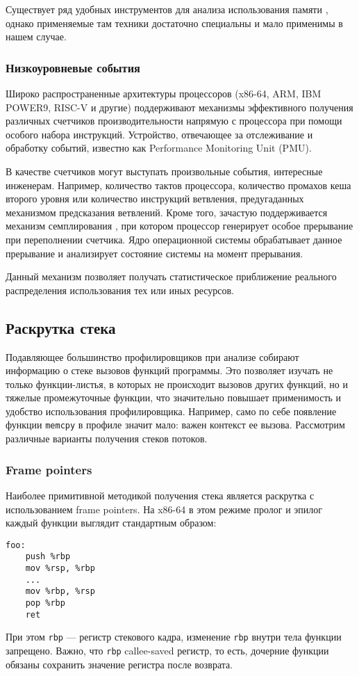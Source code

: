 Существует ряд удобных инструментов для анализа использования памяти \cite{valgrind, gperftools, tcmalloc:hp}, однако
применяемые там техники достаточно специальны и мало применимы в нашем случае.

\subsubsection{Низкоуровневые события}
Широко распространенные архитектуры процессоров (x86-64, ARM, IBM POWER9, RISC-V и другие)
поддерживают механизмы эффективного получения различных счетчиков производительности
напрямую с процессора при помощи особого набора инструкций.
Устройство, отвечающее за отслеживание и обработку событий, известно как Performance Monitoring Unit (PMU).

В качестве счетчиков могут выступать произвольные события, интересные инженерам.
Например, количество тактов процессора, количество промахов кеша второго уровня или количество
инструкций ветвления, предугаданных механизмом предсказания ветвлений.
Кроме того, зачастую поддерживается механизм семплирования \cite{linux:pmi}, при котором процессор генерирует
особое прерывание при переполнении счетчика. Ядро операционной системы обрабатывает
данное прерывание и анализирует состояние системы на момент прерывания.

Данный механизм позволяет получать статистическое приближение реального распределения использования тех или иных ресурсов.

\subsection{Раскрутка стека}
Подавляющее большинство профилировщиков при анализе собирают информацию о стеке вызовов функций программы.
Это позволяет изучать не только функции-листья, в которых не происходит вызовов других функций, но и тяжелые промежуточные функции,
что значительно повышает применимость и удобство использования профилировщика.
Например, само по себе появление функции \verb!memcpy! в профиле значит мало: важен контекст ее вызова.
Рассмотрим различные варианты получения стеков потоков.

\subsubsection{Frame pointers}
Наиболее примитивной методикой получения стека является раскрутка с использованием frame pointers.
На x86-64 в этом режиме пролог и эпилог каждый функции выглядит стандартным образом:
\begin{verbatim}
foo:
    push %rbp
    mov %rsp, %rbp
    ...
    mov %rbp, %rsp
    pop %rbp
    ret
\end{verbatim}
При этом \verb!rbp! --- регистр стекового кадра, изменение \verb!rbp! внутри тела функции запрещено.
Важно, что \verb!rbp! callee-saved регистр, то есть, дочерние функции обязаны сохранить значение регистра после возврата.

